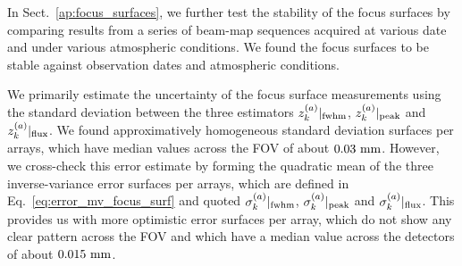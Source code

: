 In Sect.~\ref{ap:focus_surfaces}, we further test the stability of the
focus surfaces by comparing results from a series of beam-map
sequences acquired at various date and under various atmospheric
conditions. We found the focus surfaces to be stable against
observation dates and atmospheric conditions.
 
We primarily estimate the uncertainty of the focus
surface measurements using the standard deviation between the three
estimators $z_k^{(a)}|_{\rm{fwhm}}$, $z_k^{(a)}|_{\rm{peak}}$ and
$z_k^{(a)}|_{\rm{flux}}$. We found approximatively homogeneous
standard deviation surfaces per arrays, which have median values across
the FOV of about $0.03~\rm{mm}$.
However, we cross-check this error estimate by forming the quadratic mean of
the three inverse-variance error surfaces per arrays, which are defined in
Eq.~\ref{eq:error_mv_focus_surf} and quoted
$\sigma_k^{(a)}|_{\rm{fwhm}}$, $\sigma_k^{(a)}|_{\rm{peak}}$ and
$\sigma_k^{(a)}|_{\rm{flux}}$. This provides us with more optimistic
error surfaces per array, which do not show any clear pattern across
the FOV and which have a median value across the detectors of about
$0.015~\rm{mm}$.  

